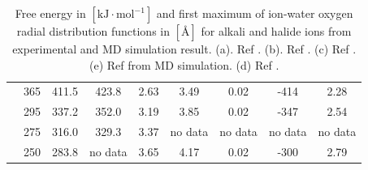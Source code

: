 \begin{table}[h]
\begin{centering}
\begin{tabular*}{1\linewidth}{@{\extracolsep{\fill}}ccccccccc}
\addlinespace[-0.33em]
{\scriptsize{}$\mathrm{Na^{+}}$ } & {\scriptsize{}365} & {\scriptsize{}411.5} & {\scriptsize{}423.8} & {\scriptsize{}2.63} & {\scriptsize{}3.49} & {\scriptsize{}0.02} & {\scriptsize{}-414} & {\scriptsize{}2.28}\tabularnewline
\addlinespace[-0.33em]
{\scriptsize{}$\mathrm{K^{+}}$ } & {\scriptsize{}295} & {\scriptsize{}337.2} & {\scriptsize{}352.0} & {\scriptsize{}3.19} & {\scriptsize{}3.85} & {\scriptsize{}0.02} & {\scriptsize{}-347} & {\scriptsize{}2.54}\tabularnewline
\addlinespace[-0.33em]
{\scriptsize{}$\mathrm{Rb^{+}}$ } & {\scriptsize{}275} & {\scriptsize{}316.0} & {\scriptsize{}329.3} & {\scriptsize{}3.37} & {\scriptsize{}no data} & {\scriptsize{}no data} & {\scriptsize{}no data} & {\scriptsize{}no data}\tabularnewline
\addlinespace[-0.33em]
{\scriptsize{}$\mathrm{Cs^{+}}$ } & {\scriptsize{}250} & {\scriptsize{}283.8} & {\scriptsize{}no data} & {\scriptsize{}3.65} & {\scriptsize{}4.17} & {\scriptsize{}0.02} & {\scriptsize{}-300} & {\scriptsize{}2.79}\tabularnewline
\bottomrule
\end{tabular*}
\par\end{centering}
\caption[Free energy and first maximum of ion-water oxygen \acs{RDF} for alkali
and halide ions from experimental and \acs{MD} simulation result]{Free energy in $[\mathrm{kJ\cdot mol^{-1}}]$ and first maximum of
ion-water oxygen radial distribution functions in $[\textrm{Å}]$
for alkali and halide ions from experimental and \acs{MD} simulation
result. (a). Ref \citep{MARCUS1994111}. (b). Ref \citep{Noyes_1962}.
(c) Ref \citep{tissandier_protons_1998}. (e) Ref \citep{horinek_rational_2009}
from \acs{MD} simulation. (d) Ref \citep{Marcus_1988}.\label{tab:single-ions}}

\vspace{0.5cm}


\end{table}
